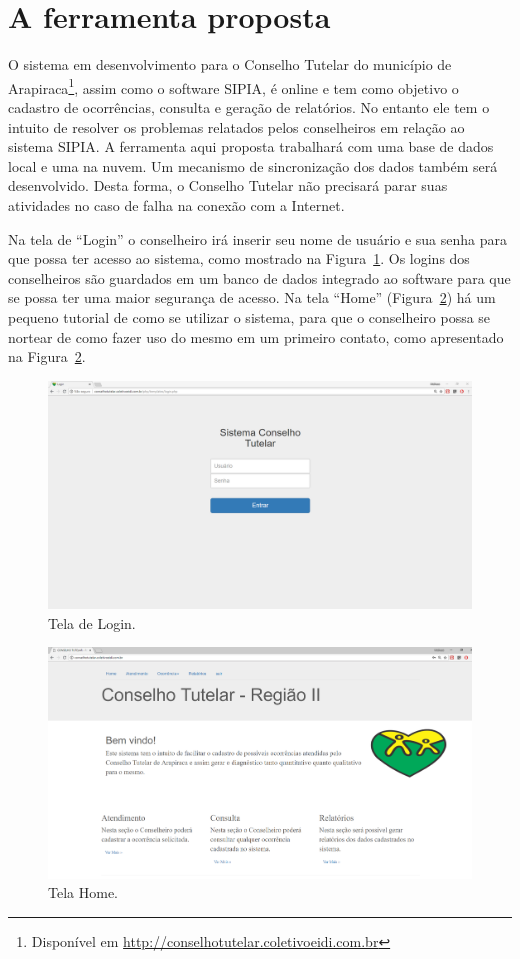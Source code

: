 \documentclass[12pt]{article}
\begin{document}
\section{A ferramenta proposta}
O sistema em desenvolvimento para o Conselho Tutelar do município de Arapiraca\footnote{Disponível em{ \url{http://conselhotutelar.coletivoeidi.com.br}}}, assim como o software SIPIA, é online e tem como objetivo o cadastro de ocorrências, consulta e geração de relatórios. No entanto ele tem o intuito de resolver os problemas relatados pelos conselheiros em relação ao sistema SIPIA. A ferramenta aqui proposta trabalhará com uma base de dados local e uma na nuvem. Um mecanismo de sincronização dos dados também será desenvolvido. Desta forma, o Conselho Tutelar não precisará parar suas atividades no caso de falha na conexão com a Internet.

Na tela de ``Login'' o conselheiro irá inserir seu nome de usuário e sua senha para que possa ter acesso ao sistema, como mostrado na Figura~\ref{fig:login}. Os logins dos conselheiros são guardados em um banco de dados integrado ao software para que se possa ter uma maior segurança de acesso. Na tela ``Home'' (Figura~\ref{fig:home}) há um pequeno tutorial de como se utilizar o sistema, para que o conselheiro possa se nortear de como fazer uso do mesmo em um primeiro contato, como apresentado na Figura~\ref{fig:home}.

\begin{figure}[ht]
\centering
\includegraphics[width=.6\textwidth]{fig/2.png}
\caption{Tela de Login.}
\label{fig:login}
\end{figure}

\begin{figure}[ht]
\centering
\includegraphics[width=.6\textwidth]{fig/3.png}
\caption{Tela Home.}
\label{fig:home}
\end{figure}
\end{document}
